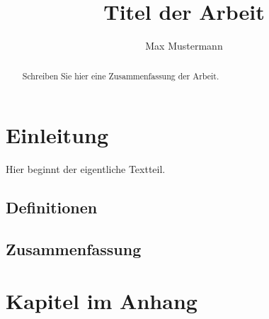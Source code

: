 \documentclass[bachelor,german]{info1thesis}
\title{Titel der Arbeit}
\author{Max Mustermann}
\begin{document}








\begin{abstract}
    Schreiben Sie hier eine Zusammenfassung der Arbeit.
\end{abstract}

\thesistableofcontents





\chapter{Einleitung}
\label{sec:einleitung}

Hier beginnt der eigentliche Textteil.




\section{Definitionen}
\label{sec:definitionen}





\section{Zusammenfassung}
\label{sec:zusammenfassung}





\thesisbibliography






\appendix
\chapter{Kapitel im Anhang}
\label{sec:anhang}
\end{document}
